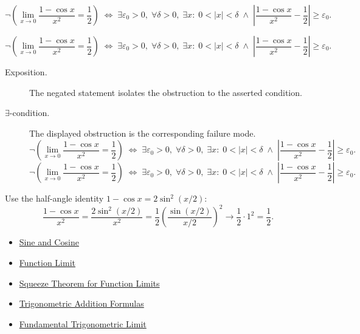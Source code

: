 \begin{remark*}
\[
  \neg\left(\lim_{x\to 0}\frac{1-\cos x}{x^2}=\frac{1}{2}\right)
  \;\iff\;
  \exists\varepsilon_0>0,\;\forall\delta>0,\;\exists x:\;
  0<|x|<\delta \;\wedge\;
  \left|\frac{1-\cos x}{x^2}-\frac{1}{2}\right|\geq\varepsilon_0.
\]
\end{remark*}

\begin{remark*}
\[
\neg\left(\lim_{x\to 0}\frac{1-\cos x}{x^2}=\frac{1}{2}\right)
  \;\iff\;
  \exists\varepsilon_0>0,\;\forall\delta>0,\;\exists x:\;
  0<|x|<\delta \;\wedge\;
  \left|\frac{1-\cos x}{x^2}-\frac{1}{2}\right|\geq\varepsilon_0.
\]
\end{remark*}

\begin{remark*}
\begin{description}
  \item[Exposition.]
  The negated statement isolates the obstruction to the asserted condition.

  \item[\(\exists\)-condition.]
  The displayed obstruction is the corresponding failure mode.
  \[
\neg\left(\lim_{x\to 0}\frac{1-\cos x}{x^2}=\frac{1}{2}\right)
  \;\iff\;
  \exists\varepsilon_0>0,\;\forall\delta>0,\;\exists x:\;
  0<|x|<\delta \;\wedge\;
  \left|\frac{1-\cos x}{x^2}-\frac{1}{2}\right|\geq\varepsilon_0.
  \]
  \[
\neg\left(\lim_{x\to 0}\frac{1-\cos x}{x^2}=\frac{1}{2}\right)
  \;\iff\;
  \exists\varepsilon_0>0,\;\forall\delta>0,\;\exists x:\;
  0<|x|<\delta \;\wedge\;
  \left|\frac{1-\cos x}{x^2}-\frac{1}{2}\right|\geq\varepsilon_0.
  \]
\end{description}
\end{remark*}



\begin{remark*}[Interpretation]
Use the half-angle identity $1 - \cos x = 2\sin^2(x/2)$:
\[
  \frac{1 - \cos x}{x^2}
  = \frac{2\sin^2(x/2)}{x^2}
  = \frac{1}{2}\left(\frac{\sin(x/2)}{x/2}\right)^2
  \to \frac{1}{2} \cdot 1^2 = \frac{1}{2}.
\]
\end{remark*}

\begin{dependencies}
\begin{itemize}
  \item \hyperref[def:sine-cosine]{Sine and Cosine}
  \item \hyperref[def:limit-function]{Function Limit}
  \item \hyperref[thm:squeeze-function-limits]{Squeeze Theorem for Function Limits}
  \item \hyperref[prop:trig-addition-formulas]{Trigonometric Addition Formulas}
  \item \hyperref[thm:fundamental-trig-limit]{Fundamental Trigonometric Limit}
\end{itemize}
\end{dependencies}
